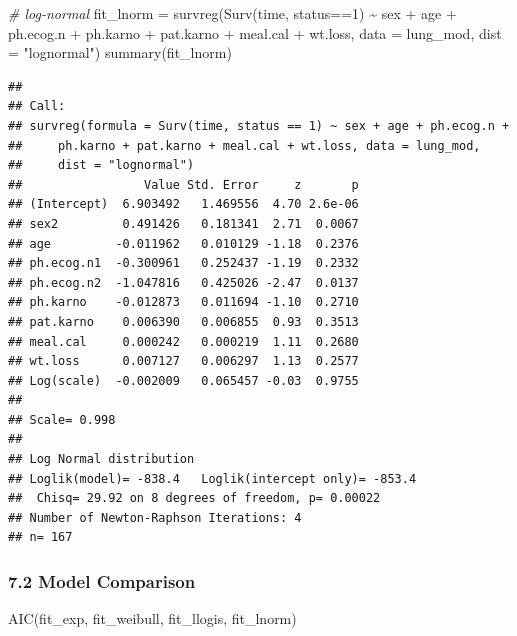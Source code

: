 \documentclass[
]{article}
\newenvironment{Shaded}{\begin{snugshade}}{\end{snugshade}}
\newcommand{\AttributeTok}[1]{\textcolor[rgb]{0.77,0.63,0.00}{#1}}
\newcommand{\CommentTok}[1]{\textcolor[rgb]{0.56,0.35,0.01}{\textit{#1}}}
\newcommand{\DecValTok}[1]{\textcolor[rgb]{0.00,0.00,0.81}{#1}}
\newcommand{\FunctionTok}[1]{\textcolor[rgb]{0.00,0.00,0.00}{#1}}
\newcommand{\NormalTok}[1]{#1}
\newcommand{\OtherTok}[1]{\textcolor[rgb]{0.56,0.35,0.01}{#1}}
\newcommand{\SpecialCharTok}[1]{\textcolor[rgb]{0.00,0.00,0.00}{#1}}
\newcommand{\StringTok}[1]{\textcolor[rgb]{0.31,0.60,0.02}{#1}}
\begin{document}
\begin{Shaded}
\begin{Highlighting}[]
\CommentTok{\# log{-}normal}
\NormalTok{fit\_lnorm }\OtherTok{=} \FunctionTok{survreg}\NormalTok{(}\FunctionTok{Surv}\NormalTok{(time, status}\SpecialCharTok{==}\DecValTok{1}\NormalTok{) }\SpecialCharTok{\textasciitilde{}}\NormalTok{ sex }\SpecialCharTok{+}\NormalTok{ age }\SpecialCharTok{+}\NormalTok{ ph.ecog.n }\SpecialCharTok{+}\NormalTok{ ph.karno }\SpecialCharTok{+}\NormalTok{ pat.karno }\SpecialCharTok{+}\NormalTok{ meal.cal }\SpecialCharTok{+}\NormalTok{ wt.loss,}
                    \AttributeTok{data =}\NormalTok{ lung\_mod, }\AttributeTok{dist =} \StringTok{"lognormal"}\NormalTok{)}
\FunctionTok{summary}\NormalTok{(fit\_lnorm)}
\end{Highlighting}
\end{Shaded}

\begin{verbatim}
## 
## Call:
## survreg(formula = Surv(time, status == 1) ~ sex + age + ph.ecog.n + 
##     ph.karno + pat.karno + meal.cal + wt.loss, data = lung_mod, 
##     dist = "lognormal")
##                 Value Std. Error     z       p
## (Intercept)  6.903492   1.469556  4.70 2.6e-06
## sex2         0.491426   0.181341  2.71  0.0067
## age         -0.011962   0.010129 -1.18  0.2376
## ph.ecog.n1  -0.300961   0.252437 -1.19  0.2332
## ph.ecog.n2  -1.047816   0.425026 -2.47  0.0137
## ph.karno    -0.012873   0.011694 -1.10  0.2710
## pat.karno    0.006390   0.006855  0.93  0.3513
## meal.cal     0.000242   0.000219  1.11  0.2680
## wt.loss      0.007127   0.006297  1.13  0.2577
## Log(scale)  -0.002009   0.065457 -0.03  0.9755
## 
## Scale= 0.998 
## 
## Log Normal distribution
## Loglik(model)= -838.4   Loglik(intercept only)= -853.4
##  Chisq= 29.92 on 8 degrees of freedom, p= 0.00022 
## Number of Newton-Raphson Iterations: 4 
## n= 167
\end{verbatim}

\hypertarget{model-comparison-1}{%
\subsubsection{7.2 Model Comparison}\label{model-comparison-1}}

\begin{Shaded}
\begin{Highlighting}[]
\FunctionTok{AIC}\NormalTok{(fit\_exp, fit\_weibull, fit\_llogis, fit\_lnorm)}
\end{Highlighting}
\end{Shaded}
\end{document}
